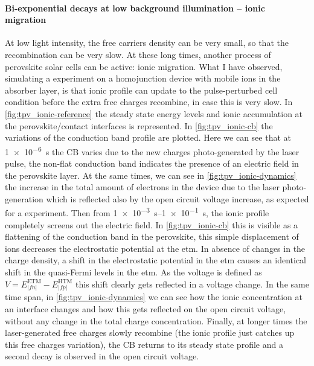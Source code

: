 	\paragraph{Bi-exponential decays at low background illumination -- ionic migration}\label{tpv_biexp_lowlight_ions}
	At low light intensity, the free carriers density can be very small, so that the recombination can be very slow.
	At these long times, another process of perovskite solar cells can be active: ionic migration.
	What I have observed, simulating a  experiment on a homojunction device with mobile ions in the absorber layer, is that ionic profile can update to the pulse-perturbed cell condition before the extra free charges recombine, in case this is very slow.
	In \cref{fig:tpv_ionic-reference} the steady state energy levels and ionic accumulation at the perovskite/contact interfaces is represented.
	In \cref{fig:tpv_ionic-cb} the variations of the conduction band profile are plotted.
	Here we can see that at \SI{1e-6}{s} the CB varies due to the new charges photo-generated by the laser pulse, the non-flat conduction band indicates the presence of an electric field in the perovskite layer.
	At the same times, we can see in \cref{fig:tpv_ionic-dynamics} the increase in the total amount of electrons in the device due to the laser photo-generation which is reflected also by the open circuit voltage increase, as expected for a  experiment.
	Then from \SIrange{1e-3}{1e-1}{s}, the ionic profile completely screens out the electric field.
	In \cref{fig:tpv_ionic-cb} this is visible as a flattening of the conduction band in the perovskite, this simple displacement of ions decreases the electrostatic potential at the \gls{etm}.
	In absence of changes in the charge density, a shift in the electrostatic potential in the \gls{etm} causes an identical shift in the quasi-Fermi levels in the \gls{etm}.
	As the voltage is defined as $V = E_|fn|^{\mathrm{ETM}} - E_|fp|^{\mathrm{HTM}}$ this shift clearly gets reflected in a voltage change.
	In the same time span, in \cref{fig:tpv_ionic-dynamics} we can see how the ionic concentration at an interface changes and how this gets reflected on the open circuit voltage, without any change in the total charge concentration. 
	Finally, at longer times the laser-generated free charges slowly recombine (the ionic profile just catches up this free charges variation), the CB returns to its steady state profile and a second decay is observed in the open circuit voltage.
